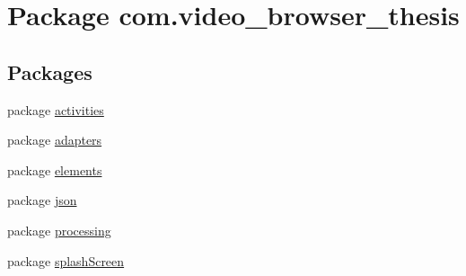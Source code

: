 \hypertarget{namespacecom_1_1video__browser__thesis}{\section{Package com.\-video\-\_\-browser\-\_\-thesis}
\label{namespacecom_1_1video__browser__thesis}
}
\subsection*{Packages}
\begin{DoxyCompactItemize}
\item 
package \hyperlink{namespacecom_1_1video__browser__thesis_1_1activities}{activities}
\item 
package \hyperlink{namespacecom_1_1video__browser__thesis_1_1adapters}{adapters}
\item 
package \hyperlink{namespacecom_1_1video__browser__thesis_1_1elements}{elements}
\item 
package \hyperlink{namespacecom_1_1video__browser__thesis_1_1json}{json}
\item 
package \hyperlink{namespacecom_1_1video__browser__thesis_1_1processing}{processing}
\item 
package \hyperlink{namespacecom_1_1video__browser__thesis_1_1splash_screen}{splash\-Screen}
\end{DoxyCompactItemize}
